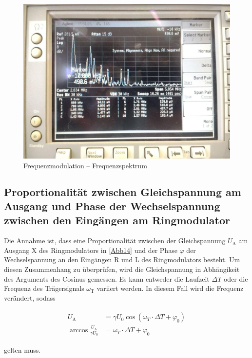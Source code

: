 \begin{figure}
	\centering
	\includegraphics[width=\textwidth]{img/Aufgabenteil_d.jpg}
	\caption{Frequenzmodulation -- Frequenzspektrum}
	\label{d2}
\end{figure}

\subsection{Proportionalit\"{a}t zwischen Gleichspannung am Ausgang und Phase der Wechselspannung zwischen den Eing\"{a}ngen am Ringmodulator}

Die Annahme ist, dass eine Proportionalität zwischen der Gleichspannung $U_\text{A}$ am Ausgang X des Ringmodulators in \autoref{Abb14} und der Phase $\varphi$ der Wechselspannung an den Eingängen R und L des Ringmodulators besteht. Um diesen Zusammenhang zu überprüfen, wird die Gleichspannung in Abhängikeit des Arguments des Cosinus gemessen. Es kann entweder die Laufzeit $\Delta T$ oder die Frequenz des Trägersignals $\omega_\text{T}$ variiert werden. In diesem Fall wird die Frequenz verändert, sodass

\begin{align}
\begin{split}
	U_\text{A} &= \gamma U_0 \cos(\omega_T \cdot \Delta T + \varphi_0)\\
	\arccos \frac{U_\text{A}}{\gamma U_0} &= \omega_T \cdot \Delta T + \varphi_0
\end{split}
\end{align}

gelten muss.

